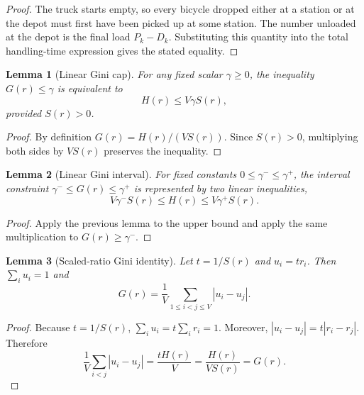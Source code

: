 \documentclass[11pt]{article}
\newtheorem{lemma}{Lemma}
\begin{document}
\begin{proof}
The truck starts empty, so every bicycle dropped either at a station or at the depot must first have been picked up at some station.  The number unloaded at the depot is the final load $P_k-D_k$.  Substituting this quantity into the total handling-time expression gives the stated equality.
\end{proof}

\begin{lemma}[Linear Gini cap]
For any fixed scalar $\gamma\ge0$, the inequality $G(r)\le \gamma$ is equivalent to
\begin{equation}
    H(r) \le V\gamma S(r),
\end{equation}
provided $S(r)>0$.
\end{lemma}

\begin{proof}
By definition $G(r)=H(r)/(VS(r))$.  Since $S(r)>0$, multiplying both sides by $VS(r)$ preserves the inequality.
\end{proof}

\begin{lemma}[Linear Gini interval]
For fixed constants $0\le \gamma^-\le\gamma^+$, the interval constraint $\gamma^-\le G(r)\le\gamma^+$ is represented by two linear inequalities,
\begin{equation}
    V\gamma^- S(r) \le H(r) \le V\gamma^+ S(r).
\end{equation}
\end{lemma}

\begin{proof}
Apply the previous lemma to the upper bound and apply the same multiplication to $G(r)\ge\gamma^-$.
\end{proof}

\begin{lemma}[Scaled-ratio Gini identity]
Let $t=1/S(r)$ and $u_i=t r_i$.  Then $\sum_i u_i=1$ and
\begin{equation}
    G(r)=\frac{1}{V}\sum_{1\le i<j\le V}|u_i-u_j|.
\end{equation}
\end{lemma}

\begin{proof}
Because $t=1/S(r)$, $\sum_i u_i=t\sum_i r_i=1$.  Moreover, $|u_i-u_j|=t|r_i-r_j|$.  Therefore
\begin{equation}
    \frac{1}{V}\sum_{i<j}|u_i-u_j| = \frac{tH(r)}{V}=\frac{H(r)}{VS(r)}=G(r).
\end{equation}
\end{proof}
\end{document}
